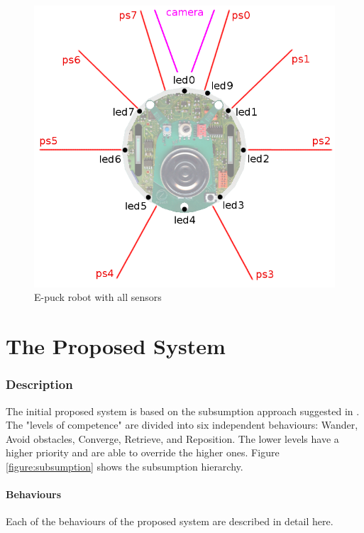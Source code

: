 \documentclass[a4paper]{article}
\begin{document}
\begin{figure}[H]
\centering
\includegraphics[scale=0.2]{e-puck_sensors_and_leds.png}
\caption{E-puck robot with all sensors}
\end{figure}

\part{The Proposed System}

\section{Description}

The initial proposed system is based on the subsumption approach suggested in \cite{assignment}.
The "levels of competence" are divided into six independent behaviours: Wander, Avoid obstacles, Converge, Retrieve, and Reposition.
The lower levels have a higher priority and are able to override the higher ones.
Figure \vref{figure:subsumption} shows the subsumption hierarchy.



\subsection{Behaviours}

Each of the behaviours of the proposed system are described in detail here.
\end{document}
